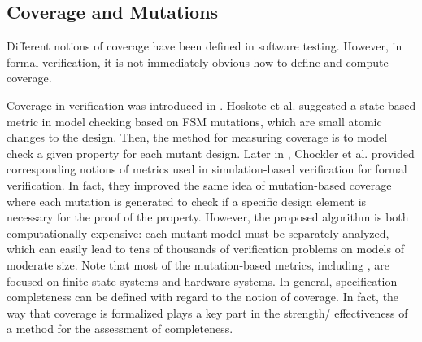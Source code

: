 \subsection{Coverage and Mutations}

Different notions of coverage have been defined in software testing. However, in formal verification, it is not immediately obvious how to define and compute coverage.

Coverage in verification was introduced in \cite{hoskote1999coverage, katz1999have}. Hoskote et al. \cite{hoskote1999coverage} suggested a state-based metric in model checking based on FSM mutations, which are small atomic changes to the design. Then, the method for measuring coverage is to model check a given property for each mutant design.
Later in \cite{chockler_coverage_2003}, Chockler et al. provided corresponding notions of metrics used in simulation-based verification for formal verification. In fact, they improved the same idea of mutation-based coverage where each mutation is generated to check if a specific
design element is necessary for the proof of the property.
 However, the proposed algorithm is both computationally expensive: each mutant model must be separately analyzed, which can easily lead to tens of thousands of verification problems on models of moderate size. Note that most of the mutation-based metrics, including \cite{kupferman_theory_2008, chockler2001practical}, are focused on finite state systems and hardware systems.
In general, specification completeness can be defined with
regard to the notion of coverage. In fact, the way that coverage
is formalized plays a key part in the strength/ effectiveness of
a method for the assessment of completeness. 

